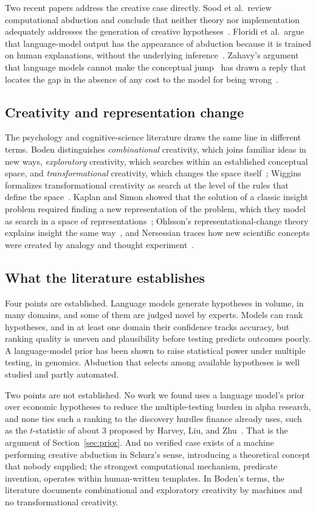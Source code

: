 \documentclass[11pt]{article}
\begin{document}
Two recent papers address the creative case directly. Sood et al.\ review computational abduction and
conclude that neither theory nor implementation adequately addresses the generation of creative
hypotheses~\cite{sood}. Floridi et al.\ argue that language-model output has the appearance of abduction
because it is trained on human explanations, without the underlying inference~\cite{floridi}. Zahavy's
argument that language models cannot make the conceptual jump~\cite{zahavy} has drawn a reply that
locates the gap in the absence of any cost to the model for being wrong~\cite{balani}.

\subsection{Creativity and representation change}

The psychology and cognitive-science literature draws the same line in different terms. Boden
distinguishes \emph{combinational} creativity, which joins familiar ideas in new ways,
\emph{exploratory} creativity, which searches within an established conceptual space, and
\emph{transformational} creativity, which changes the space itself~\cite{boden}; Wiggins formalizes
transformational creativity as search at the level of the rules that define the space~\cite{wiggins}.
Kaplan and Simon showed that the solution of a classic insight problem required finding a new
representation of the problem, which they model as search in a space of
representations~\cite{kaplansimon}; Ohlsson's representational-change theory explains insight the same
way~\cite{ohlsson}, and Nersessian traces how new scientific concepts were created by analogy and
thought experiment~\cite{nersessian}.

\subsection{What the literature establishes}

Four points are established. Language models generate hypotheses in volume, in many domains, and some
of them are judged novel by experts. Models can rank hypotheses, and in at least one domain their
confidence tracks accuracy, but ranking quality is uneven and plausibility before testing predicts
outcomes poorly. A language-model prior has been shown to raise statistical power under multiple testing,
in genomics. Abduction that selects among available hypotheses is well studied and partly automated.

Two points are not established. No work we found uses a language model's prior over economic hypotheses
to reduce the multiple-testing burden in alpha research, and none ties such a ranking to the
discovery hurdles finance already uses, such as the $t$-statistic of about 3 proposed by Harvey, Liu, and
Zhu~\cite{harvey}. That is the argument of Section~\ref{sec:prior}. And no verified case exists of a machine performing creative abduction in
Schurz's sense, introducing a theoretical concept that nobody supplied; the strongest computational
mechanism, predicate invention, operates within human-written templates. In Boden's terms, the
literature documents combinational and exploratory creativity by machines and no transformational
creativity.
\end{document}
